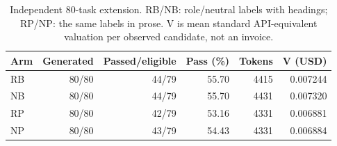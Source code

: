 \begin{table}[t]\centering\small
\caption{Independent 80-task extension. RB/NB: role/neutral labels with headings; RP/NP: the same labels in prose. V is mean standard API-equivalent valuation per observed candidate, not an invoice.}\label{tab:seg80-groups}
\begin{tabular*}{\linewidth}{@{\extracolsep{\fill}}lrrrrr}\toprule
Arm & Generated & Passed/eligible & Pass (\%) & Tokens & V (USD)\\
\midrule
RB & 80/80 & 44/79 & 55.70 & 4415 & 0.007244\\
NB & 80/80 & 44/79 & 55.70 & 4431 & 0.007320\\
RP & 80/80 & 42/79 & 53.16 & 4331 & 0.006881\\
NP & 80/80 & 43/79 & 54.43 & 4331 & 0.006884\\
\bottomrule\end{tabular*}\end{table}
